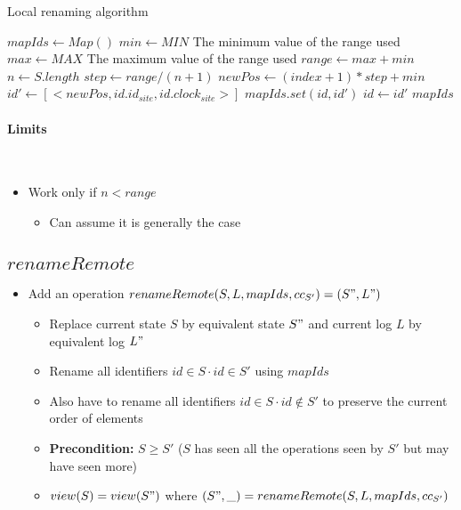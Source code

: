 \documentclass[a4paper]{article}
\begin{document}
\begin{algorithm}
  \caption{Local renaming algorithm}
  \label{alg:local-rename}
  \begin{algorithmic}
      \State $mapIds \gets Map()$
      \State $min \gets MIN$
      \Comment The minimum value of the range used
      \State $max \gets MAX$
      \Comment The maximum value of the range used
      \State $range \gets max + min$
      \State $n \gets S.length$
      \State $step \gets range / (n + 1)$
        \State $newPos \gets (index + 1) * step + min$
        \State $id' \gets [<newPos, id.id_{site}, id.clock_{site}>]$
        \State $mapIds.set(id, id')$
        \State $id \gets id'$
      \EndFor
      \State \Return $mapIds$
    \EndFunction
  \end{algorithmic}
\end{algorithm}

\paragraph{Limits}~\\

\begin{itemize}
  \item Work only if $n < range$
  \begin{itemize}
    \item Can assume it is generally the case
  \end{itemize}
\end{itemize}

\subsection{$renameRemote$}

\begin{itemize}
  \item Add an operation $renameRemote(S, L, mapIds, cc_{S'}) = (S", L")$
  \begin{itemize}
    \item Replace current state $S$ by equivalent state $S"$ and current log $L$ by equivalent log $L"$
    \item Rename all identifiers $id \in S \cdot id \in S'$ using $mapIds$
    \item Also have to rename all identifiers $id \in S \cdot id \notin S'$ to preserve the current order of elements
    \item \textbf{Precondition: } $S \geq S'$ ($S$ has seen all the operations seen by $S'$ but may have seen more)
    \item $view(S) = view(S")$ where $(S", \_) = renameRemote(S, L, mapIds, cc_{S'})$
  \end{itemize}
\end{itemize}
\end{document}
